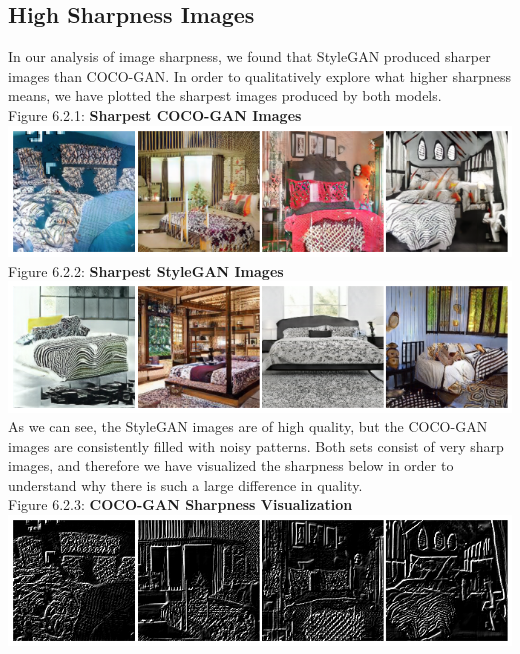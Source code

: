 \documentclass[10pt]{article}
\begin{document}
\begin{multicols*}{2}
        \subsection{High Sharpness Images}
        In our analysis of image sharpness, we found that StyleGAN produced sharper images than COCO-GAN.
        In order to qualitatively explore what higher sharpness means, we have plotted the sharpest images produced by both models.\\
        
        Figure 6.2.1: \textbf{Sharpest COCO-GAN Images} \\
        \includegraphics[scale=0.35]{sharpness-images/coco_sharpness.png}
        \\ Figure 6.2.2: \textbf{Sharpest StyleGAN Images}\\
        \includegraphics[scale=0.35]{sharpness-images/stylegan_sharpness.png}
        \\
        As we can see, the StyleGAN images are of high quality, but the COCO-GAN images are consistently filled with noisy patterns.
        Both sets consist of very sharp images, and therefore we have visualized the sharpness below in order to understand why there is such a large difference in quality.
        \\ Figure 6.2.3: \textbf{COCO-GAN Sharpness Visualization}\\
        \includegraphics[scale=0.35]{sharpness-images/coco_sharpness_lines.png}

\end{multicols*}
\end{document}
